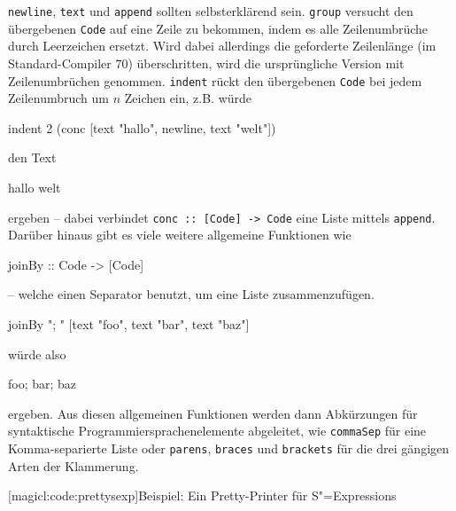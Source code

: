 \documentclass[12pt, a4paper, bibgerm]{scrbook}
\newenvironment{DIFnomarkup}{}{}
\newcommand\icode[1]{\lstinline?#1?}
\newcommand\lsubsection{}
\newcommand{\sexps}{S"=Expressions}
\begin{document}
\icode{newline}, \icode{text} und \icode{append} sollten selbsterklärend
sein. \icode{group} versucht den übergebenen \icode{Code} auf eine Zeile
zu bekommen, indem es alle Zeilenumbrüche durch Leerzeichen
ersetzt. Wird dabei allerdings die geforderte Zeilenlänge (im
Standard-Compiler 70) überschritten, wird die ursprüngliche Version mit
Zeilenumbrüchen genommen. \icode{indent} rückt den übergebenen
\icode{Code} bei jedem Zeilenumbruch um $n$ Zeichen ein, z.B. würde
\begin{DIFnomarkup}\begin{code}
indent 2 (conc [text "hallo", newline, text "welt"])
\end{code}\end{DIFnomarkup}
den Text
\begin{DIFnomarkup}\begin{code}
hallo
  welt
\end{code}\end{DIFnomarkup}
ergeben -- dabei verbindet \icode{conc :: [Code] -> Code} eine Liste
mittels \icode{append}. Darüber hinaus gibt es viele weitere allgemeine
Funktionen wie
\begin{DIFnomarkup}\begin{code}
  joinBy :: Code -> [Code]
\end{code}\end{DIFnomarkup}
-- welche einen Separator benutzt, um eine Liste zusammenzufügen.
\begin{DIFnomarkup}\begin{code}
joinBy "; " [text "foo", text "bar", text "baz"]
\end{code}\end{DIFnomarkup}
würde also
\begin{DIFnomarkup}\begin{code}
foo; bar; baz
\end{code}\end{DIFnomarkup}
ergeben. Aus diesen allgemeinen Funktionen werden dann Abkürzungen für
syntaktische Programmiersprachenelemente abgeleitet, wie
\icode{commaSep} für eine Komma-separierte Liste oder \icode{parens},
\icode{braces} und \icode{brackets} für die drei gängigen Arten der
Klammerung.

\lsubsection[magicl:code:prettysexp]{Beispiel: Ein Pretty-Printer für \sexps{}}
\end{document}
